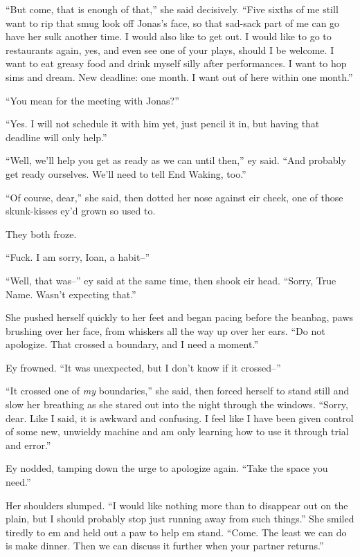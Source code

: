 ``But come, that is enough of that,'' she said decisively. ``Five sixths of me still want to rip that smug look off Jonas's face, so that sad-sack part of me can go have her sulk another time. I would also like to get out. I would like to go to restaurants again, yes, and even see one of your plays, should I be welcome. I want to eat greasy food and drink myself silly after performances. I want to hop sims and dream. New deadline: one month. I want out of here within one month.''

``You mean for the meeting with Jonas?''

``Yes. I will not schedule it with him yet, just pencil it in, but having that deadline will only help.''

``Well, we'll help you get as ready as we can until then,'' ey said. ``And probably get ready ourselves. We'll need to tell End Waking, too.''

``Of course, dear,'' she said, then dotted her nose against eir cheek, one of those skunk-kisses ey'd grown so used to.

They both froze.

``Fuck. I am sorry, Ioan, a habit--''

``Well, that was--'' ey said at the same time, then shook eir head. ``Sorry, True Name. Wasn't expecting that.''

She pushed herself quickly to her feet and began pacing before the beanbag, paws brushing over her face, from whiskers all the way up over her ears. ``Do not apologize. That crossed a boundary, and I need a moment.''

Ey frowned. ``It was unexpected, but I don't know if it crossed--''

``It crossed one of \emph{my} boundaries,'' she said, then forced herself to stand still and slow her breathing as she stared out into the night through the windows. ``Sorry, dear. Like I said, it is awkward and confusing. I feel like I have been given control of some new, unwieldy machine and am only learning how to use it through trial and error.''

Ey nodded, tamping down the urge to apologize again. ``Take the space you need.''

Her shoulders slumped. ``I would like nothing more than to disappear out on the plain, but I should probably stop just running away from such things.'' She smiled tiredly to em and held out a paw to help em stand. ``Come. The least we can do is make dinner. Then we can discuss it further when your partner returns.''
